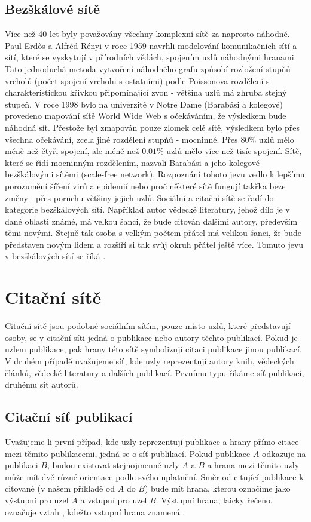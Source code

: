\documentclass[12pt,titlepage]{report}
\begin{document}
\subsection{Bezškálové sítě}
Více než 40 let byly považovány všechny komplexní sítě za naprosto náhodné.
Paul Erdős a Alfréd Rényi v roce 1959 navrhli modelování komunikačních sítí a
sítí, které se vyskytují v přírodních vědách, spojením uzlů náhodnými hranami.
Tato jednoduchá metoda vytvoření náhodného grafu způsobí rozložení stupňů
vrcholů (počet spojení vrcholu s ostatními) podle Poissonova rozdělení s
charakteristickou křivkou připomínající zvon - většina uzlů má zhruba stejný
stupeň. 
V roce 1998 bylo na univerzitě v Notre Dame (Barabási a kolegové) provedeno
mapování sítě World Wide Web s očekáváním, že výsledkem bude náhodná síť.
Přestože byl zmapován pouze zlomek celé sítě, výsledkem bylo přes všechna
očekávání, zcela jiné rozdělení stupňů - mocninné. Přes $80\%$ uzlů mělo méně
než čtyři spojení, ale méně než $0.01\%$ uzlů mělo více než tisíc spojení.
Sítě, které se řídí mocninným rozdělením, nazvali Barabási a jeho kolegové
bezškálovými sítěmi (scale-free network). Rozpoznání tohoto jevu vedlo k
lepšímu porozumění šíření virů a epidemií nebo proč některé sítě fungují takřka
beze změny i přes poruchu většiny jejich uzlů.  Sociální a citační sítě se řadí
do kategorie bezškálových sítí. Například autor vědecké literatury, jehož dílo
je v dané oblasti známé, má velkou šanci, že bude citován dalšími autory,
především těmi novými. Stejně tak osoba s velkým počtem přátel má velikou
šanci, že bude představen novým lidem a rozšíří si tak svůj okruh přátel ještě
více. Tomuto jevu v bezškálových sítí se říká .

\section{Citační sítě}
Citační sítě jsou podobné sociálním sítím, pouze místo uzlů, které představují
osoby, se v citační síti jedná o publikace nebo autory těchto publikací. Pokud
je uzlem publikace, pak hrany této sítě symbolizují citaci publikace jinou
publikací. V druhém případě uvažujeme síť, kde uzly reprezentují autory knih,
vědeckých článků, vědecké literatury a dalších publikací. Prvnímu typu říkáme
síť publikací, druhému síť autorů.

\subsection{Citační síť publikací}
Uvažujeme-li první případ, kde uzly reprezentují publikace a hrany přímo citace
mezi těmito publikacemi, jedná se o síť publikací. Pokud publikace $A$ odkazuje
na publikaci $B$, budou existovat stejnojmenné uzly $A$ a $B$ a hrana mezi
těmito uzly může mít dvě různé orientace podle svého uplatnění. Směr od
citující publikace k citované (v našem příkladě od $A$ do $B$) bude mít hrana,
kterou označíme jako výstupní pro uzel $A$ a vstupní pro uzel $B$.  Výstupní
hrana, laicky řečeno, označuje vztah , kdežto vstupní hrana znamená
.
\end{document}
